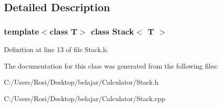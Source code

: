 \subsection{Detailed Description}
\subsubsection*{template$<$class T$>$ class Stack$<$ T $>$}





Definition at line 13 of file Stack.h.

The documentation for this class was generated from the following files:\begin{CompactItemize}
\item 
C:/Users/Rosi/Desktop/belajar/Calculator/Stack.h\item 
C:/Users/Rosi/Desktop/belajar/Calculator/Stack.cpp\end{CompactItemize}
